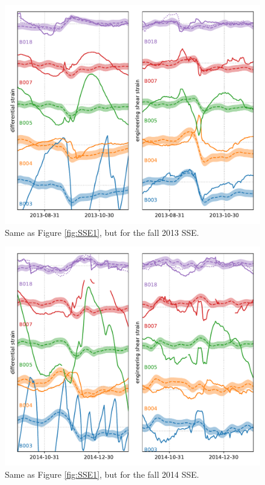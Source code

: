 \documentclass[10pt,a4paper]{article}
\begin{document}
\begin{figure}
\includegraphics{figures/SSE4.pdf}
\caption{Same as Figure \ref{fig:SSE1}, but for the fall 2013 SSE.}   
\label{fig:SSE4}
\end{figure}

\begin{figure}
\includegraphics{figures/SSE5.pdf}
\caption{Same as Figure \ref{fig:SSE1}, but for the fall 2014 SSE.}   
\label{fig:SSE5}
\end{figure}
\end{document}
